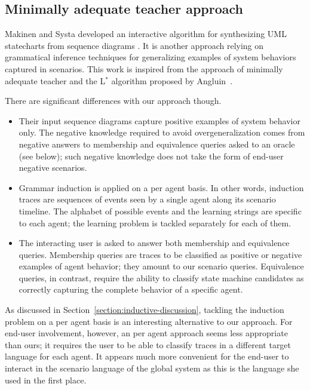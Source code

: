 \subsection{Minimally adequate teacher approach}

Makinen and Systa developed an interactive algorithm for synthesizing UML statecharts from sequence diagrams \cite{Makinen:2001}. It is another approach relying on grammatical inference techniques for generalizing examples of system behaviors captured in scenarios. This work is inspired from the approach of minimally adequate teacher and the L$^*$ algorithm proposed by Angluin~\cite{Angluin:1987}. 

There are significant differences with our approach though.
\begin{itemize}

\item Their input sequence diagrams capture positive examples of system behavior only. The negative knowledge required to avoid overgeneralization comes from negative answers to membership and equivalence queries asked to an oracle (see below); such negative knowledge does not take the form of end-user negative scenarios.

\item Grammar induction is applied on a per agent basis. In other words, induction traces are sequences of events seen by a single agent along its scenario timeline. The alphabet of possible events and the learning strings are specific to each agent; the learning problem is tackled separately for each of them.

\item The interacting user is asked to answer both membership and equivalence queries. Membership queries are traces to be classified as positive or negative examples of agent behavior; they amount to our scenario queries. Equivalence queries, in contrast, require the ability to classify state machine candidates as correctly capturing the complete behavior of a specific agent.
\end{itemize}

As discussed in Section~\ref{section:inductive-discussion}, tackling the induction problem on a per agent basis is an interesting alternative to our approach. For end-user involvement, however, an per agent approach seems less appropriate than ours; it requires the user to be able to classify traces in a different target language for each agent. It appears much more convenient for the end-user to interact in the scenario language of the global system as this is the language she used in the first place.

